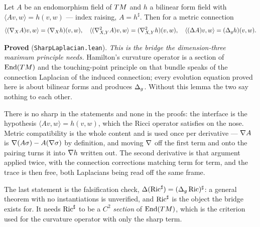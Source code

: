 \begin{lemma}
  \label{lem:sharp-laplacian}
  \leanok
  Let $A$ be an endomorphism field of $TM$ and $h$ a bilinear form field with
  $\langle Av, w\rangle = h(v,w)$ --- index raising, $A = h^\sharp$. Then for a metric
  connection
  \[
    \langle (\nabla_X A)v, w\rangle = (\nabla_X h)(v,w),\quad
    \langle (\nabla^2_{X,Y}A)v, w\rangle = (\nabla^2_{X,Y}h)(v,w),\quad
    \langle (\Delta A)v, w\rangle = (\Delta_g h)(v,w).
  \]

  \textbf{Proved} (\texttt{SharpLaplacian.lean}). \emph{This is the bridge the
  dimension-three maximum principle needs.} Hamilton's curvature operator is a section of
  $\mathrm{End}(TM)$ and the touching-point principle on that bundle speaks of the
  connection Laplacian of the induced connection; every evolution equation proved here is
  about bilinear forms and produces $\Delta_g$. Without this lemma the two say nothing to
  each other.

  There is no sharp in the statements and none in the proofs: the interface is the hypothesis
  $\langle Av,w\rangle = h(v,w)$, which the Ricci operator satisfies on the nose. Metric
  compatibility is the whole content and is used once per derivative --- $\nabla A$ is
  $\nabla(A\sigma) - A(\nabla\sigma)$ by definition, and moving $\nabla$ off the first term and
  onto the pairing turns it into $\nabla h$ written out. The second derivative is that argument
  applied twice, with the connection corrections matching term for term, and the trace is
  then free, both Laplacians being read off the same frame.

  The last statement is the falsification check, $\Delta(\operatorname{Ric}^\sharp) =
  (\Delta_g\operatorname{Ric})^\sharp$: a general theorem with no instantiations is unverified, and
  $\operatorname{Ric}^\sharp$ is the object the bridge exists for. It needs $\operatorname{Ric}^\sharp$ to be a $C^2$
  \emph{section} of $\mathrm{End}(TM)$, which is the criterion used for the curvature
  operator with only the sharp term.
\end{lemma}


